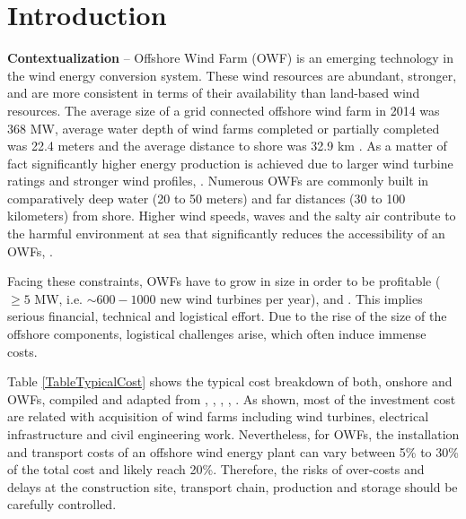 \section{Introduction}
\label{Sec-Introduction}
\textbf{Contextualization} --
Offshore Wind Farm (OWF) is an emerging technology in the wind energy conversion system. These wind resources are abundant, stronger, and are more consistent in terms of their availability than land-based wind resources. The average size of a grid connected offshore wind farm in 2014 was 368 MW, average water depth of wind farms completed or partially completed was 22.4 meters and the average distance to shore was 32.9 km \cite{Giorgio2015}. As a matter of fact significantly higher energy production is achieved due to larger wind turbine ratings and stronger wind profiles, \cite{Sun2012298}. Numerous OWFs are commonly built in comparatively deep water (20 to 50 meters) and far distances (30 to 100 kilometers) from shore. Higher wind speeds, waves and the salty air contribute to the harmful environment at sea that significantly reduces the accessibility of an OWFs, \cite{Smit2007}.



Facing these constraints, OWFs have to grow in size in order to be profitable ($\geq 5$ MW, i.e. $\sim600-1000$ new wind turbines per year), \cite{EWEA2011} and \cite{Kaldellis2013}. This implies serious financial, technical and logistical effort. Due to the rise of the size of the offshore components, logistical challenges arise, which often induce immense costs.

Table \ref{TableTypicalCost} shows the typical cost breakdown of both, onshore and OWFs, compiled and adapted from \cite{Henderson2003}, \cite{Junginger2004}, \cite{UK10}, \cite{TCE12}, \cite{IRENA12}. As shown, most of the investment cost are related with acquisition of wind farms including wind turbines, electrical infrastructure and civil engineering work. Nevertheless, for OWFs, the installation and transport costs of an offshore wind energy plant can vary between 5\% to 30\% of the total cost and likely reach 20\%. Therefore, the risks of over-costs and delays at the construction site, transport chain, production and storage should be carefully controlled.

